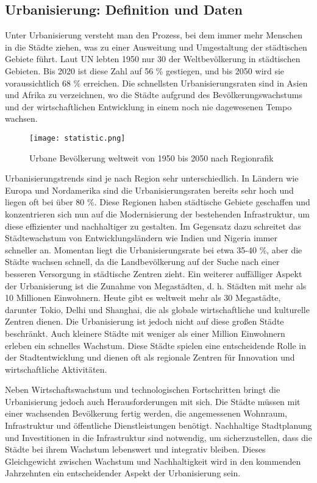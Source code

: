 \documentclass[conference,compsoc,final,a4paper, onecolumn, 11pt]{IEEEtran}
\begin{document}
\subsection{Urbanisierung: Definition und Daten}
Unter Urbanisierung versteht man den Prozess, bei dem immer mehr Menschen in die Städte ziehen, was zu einer Ausweitung und Umgestaltung der städtischen Gebiete führt. 
Laut \ac{UN} lebten 1950 nur 30 der Weltbevölkerung in städtischen Gebieten. 
Bis 2020 ist diese Zahl auf 56 \% gestiegen, und bis 2050 wird sie voraussichtlich 68 \% erreichen. 
Die schnellsten Urbanisierungsraten sind in Asien und Afrika zu verzeichnen, wo die Städte aufgrund des Bevölkerungswachstums und der wirtschaftlichen Entwicklung in einem noch nie dagewesenen Tempo wachsen. \autocite[S. 6f]{taubenbock_globale_2015}

\begin{figure}[!ht]
  \centering
  \texttt{[image: statistic.png]}
  \caption{Urbane Bevölkerung weltweit von 1950 bis 2050 nach Regionrafik~\cite{noauthor_change_nodate}}
  \label{statistic}
\end{figure}

Urbanisierungstrends sind je nach Region sehr unterschiedlich. 
In Ländern wie Europa und Nordamerika sind die Urbanisierungsraten bereits sehr hoch und liegen oft bei über 80 \%. 
Diese Regionen haben städtische Gebiete geschaffen und konzentrieren sich nun auf die Modernisierung der bestehenden Infrastruktur, um diese effizienter und nachhaltiger zu gestalten. 
Im Gegensatz dazu schreitet das Städtewachstum von  Entwicklungsländern wie Indien und Nigeria immer schneller an. 
Momentan liegt die Urbanisierungsrate bei etwa 35-40 \%, aber die Städte wachsen schnell, da die Landbevölkerung auf der Suche nach einer besseren Versorgung in städtische Zentren zieht. \autocite[S. 6ff]{taubenbock_globale_2015}
Ein weiterer auffälliger Aspekt der Urbanisierung ist die Zunahme von Megastädten, d. h. Städten mit mehr als 10 Millionen Einwohnern. 
Heute gibt es weltweit mehr als 30 Megastädte, darunter Tokio, Delhi und Shanghai, die als globale wirtschaftliche und kulturelle Zentren dienen. \autocite[S. 50]{taubenbock_globale_2015}
Die Urbanisierung ist jedoch nicht auf diese großen Städte beschränkt. 
Auch kleinere Städte mit weniger als einer Million Einwohnern erleben ein schnelles Wachstum. 
Diese Städte spielen eine entscheidende Rolle in der Stadtentwicklung und dienen oft als regionale Zentren für Innovation und wirtschaftliche Aktivitäten.

Neben Wirtschaftswachstum und technologischen Fortschritten bringt die Urbanisierung jedoch auch Herausforderungen mit sich. 
Die Städte müssen mit einer wachsenden Bevölkerung fertig werden, die angemessenen Wohnraum, Infrastruktur und öffentliche Dienstleistungen benötigt. 
Nachhaltige Stadtplanung und Investitionen in die Infrastruktur sind notwendig, um sicherzustellen, dass die Städte bei ihrem Wachstum lebenswert und integrativ bleiben. \autocite[S. 13ff]{zhang_trends_2015}
Dieses Gleichgewicht zwischen Wachstum und Nachhaltigkeit wird in den kommenden Jahrzehnten ein entscheidender Aspekt der Urbanisierung sein. 
\end{document}
